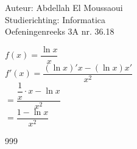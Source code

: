 \documentclass[a4paper]{article}
\begin{document}
  
\noindent \large Auteur: Abdellah El Moussaoui \\
\noindent \large Studierichting: Informatica\\
\noindent \large Oefeningenreeks 3A nr. 36.18\\

\medskip

\normalsize

$f(x)=\dfrac{\ln x}{x}$\\

$f'(x)=\dfrac{\left(\ln x\right)'x-\left(\ln x\right)x'}{x^2}$\\

$=\dfrac{\dfrac{1}{x}\cdot x- \ln x}{x^2}$\\

$=\dfrac{1- \ln x}{x^2}$\\




\begin{thebibliography}{999}
\end{thebibliography}
\end{document}
